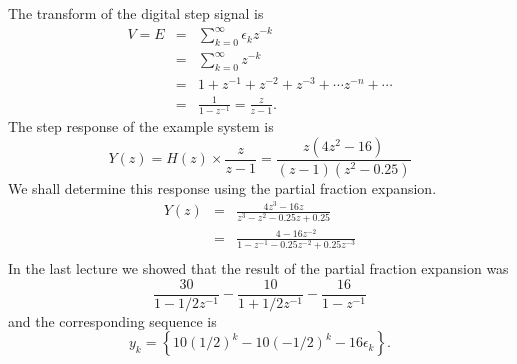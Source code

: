 The transform of the digital step signal is
\begin{eqnarray}\label{eq:l10e6}
  V = E &=& \sum_{k=0}^{\infty}\epsilon_k z^{-k}\\
        &=& \sum_{k=0}^{\infty} z^{-k}\nonumber \\
        &=& 1 + z^{-1} + z^{-2} + z^{-3} + \cdots z^{-n} + \cdots \nonumber\\
        &=& \frac{1}{1-z^{-1}} = \frac{z}{z-1}.
\end{eqnarray}
The step response of the example system is
\[ Y(z) = H(z)\times \frac{z}{z-1} = \frac{z(4z^2 - 16)}{(z-1)(z^2 - 0.25)}\]
We shall determine this response using the partial fraction
expansion.
\begin{eqnarray*}
Y(z) &=& \frac{4z^3 - 16z}{z^3 - z^2 - 0.25z + 0.25}\\
 &=& \frac{4 - 16z^{-2}}{1 - z^{-1} - 0.25z^{-2} + 0.25z^{-3}}\\
\end{eqnarray*}
In the last lecture we showed that the result of the partial
fraction expansion was
\[\frac{30}{1-1/2 z^{-1}} - \frac{10}{1+1/2z^{-1}} -
\frac{16}{1-z^{-1}}\] and the corresponding sequence is
\[y_k = \left\{10(1/2)^k -10(-1/2)^k -16\epsilon_k\right\}.\]


\endinput

